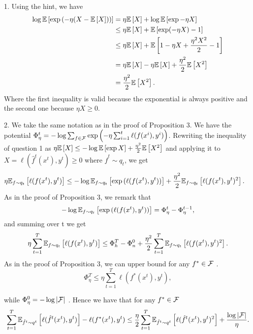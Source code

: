 \begin{solution}[]
1. Using the hint, we have
\begin{align*}
	\log \EE{\exp{(-\eta (X - \EE{X}))}} &= \eta \EE{X} + \log \EE{\exp{-\eta X}}\\
					     &\leq \eta \EE{X}+ \EE{\exp(-\eta X ) -1}	\\
					     &\leq \eta \EE{X} + \EE{1 -\eta X + \frac{\eta^2 X^2}{2}-1}\\
					     &= \eta \EE{X} - \eta \EE{X} + \frac{\eta^2}{2}\EE{X^2}\\
					     &= \frac{\eta^2}{2} \EE{X^2}.
\end{align*}
Where the first inequality is valid because the exponential is always positive and the second one because $ \eta X \geq
0$.

2. We take the same notation as in the proof of Proposition 3. We have the potential
$ \Phi_\eta^t = -\log \sum_{f \in \F}\exp{\left( -\eta \sum_{i=1}^{t}\ell(f(x^{i}),y^i) \right)} $.
Rewriting the inequality of question 1 as $ \eta \EE{X} \leq -\log \EE{\exp{X}} + \frac{\eta^2}{2}\EE{X^2} $ and
applying it to $ X = \ell(\hat{f}^{t}(x^t),y^t) \geq  0 $ where $ \hat{f}^t \sim q_t $, we get
\begin{align*}
	\eta \EEs{\ell(f(x^t),y^t)}{f\sim q_t} &\leq -\log \EEs{\exp{(\ell(f(x^t),y^t))}}{f\sim q_t} +
	\frac{\eta^2}{2}\EEs{\ell(f(x^t),y^t)^2}{f\sim q_t}.
\end{align*}
As in the proof of Proposition 3, we remark that
\begin{equation*}
	-\log\EEs{\exp{(\ell(f(x^t),y^t))}}{f\sim q_t} = \Phi_{\eta}^t - \Phi_{\eta}^{t-1},
\end{equation*}
and summing over t we get
\begin{equation*}
	\eta \sum_{t=1}^{T}\EEs{\ell(f(x^t),y^t)}{f \sim q_t} \leq \Phi_{h}^{T} - \Phi_{n}^{0} +
	\frac{\eta^2}{2}\sum_{t=1}^{T}\EEs{\ell(f(x^t),y^t)^2}{f\sim q_t}.
\end{equation*}
As in the proof of Proposition 3, we can upper bound for any $ f^{*}\in \F $ .
\begin{equation*}
	\Phi_{\eta}^T \leq \eta \sum_{t=1}^{T}\ell(f^{*}(x^t),y^t),
\end{equation*}

while $ \Phi_{\eta}^0 = - \log |\F|$
. Hence we have that for any $ f^{*}\in \F $
\begin{equation*}
	\sum_{t=1}^{T}\EEs{\ell(\hat{f}^{t}(x^t),y^t)}{\hat{f}^{t}\sim q^{t}} - \ell(f^{*}(x^t),y^t) \leq
	\frac{\eta}{2}\sum_{t=1}^{T}\EEs{\ell(\hat{f}^{t}(x^t),y^t)^2}{\hat{f}^{t}\sim q^{t}} + \frac{\log |\F|}{\eta}.
\end{equation*}


\end{solution}
